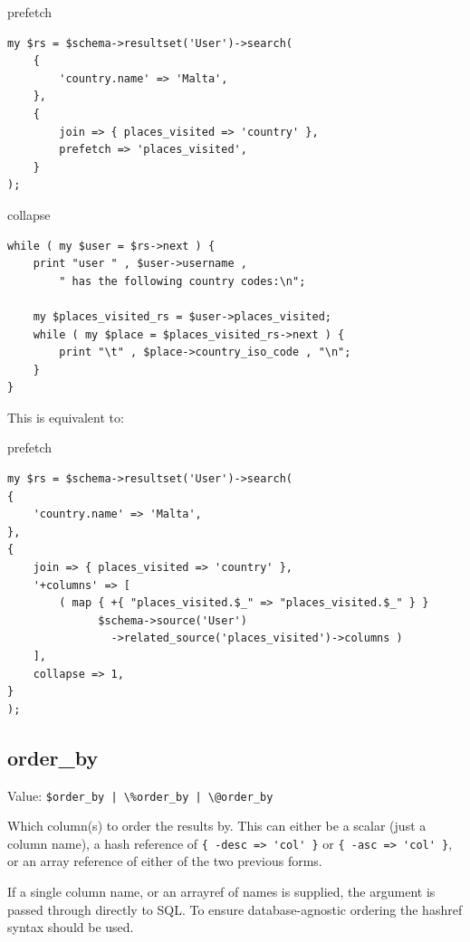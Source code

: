 \begin{frame}[fragile]{prefetch}
\begin{lstlisting}
my $rs = $schema->resultset('User')->search(
    {
        'country.name' => 'Malta',
    },
    {
        join => { places_visited => 'country' },
        prefetch => 'places_visited',
    }
);
\end{lstlisting}
\end{frame}

\begin{frame}[fragile]{collapse}
\begin{lstlisting}
while ( my $user = $rs->next ) {
    print "user " , $user->username ,
        " has the following country codes:\n";

    my $places_visited_rs = $user->places_visited;
    while ( my $place = $places_visited_rs->next ) {
        print "\t" , $place->country_iso_code , "\n";
    }
}
\end{lstlisting}
\end{frame}



This is equivalent to:

\begin{frame}[fragile]{prefetch}
\begin{lstlisting}
my $rs = $schema->resultset('User')->search(
{
    'country.name' => 'Malta',
},
{
    join => { places_visited => 'country' },
    '+columns' => [
        ( map { +{ "places_visited.$_" => "places_visited.$_" } }
              $schema->source('User')
                ->related_source('places_visited')->columns )
    ],
    collapse => 1,
}
);
\end{lstlisting}
\end{frame}

\subsection{order\_by}

Value: \verb=$order_by | \%order_by | \@order_by=

Which column(s) to order the results by. This can either be a scalar (just a
column name), a hash reference of \verb|{ -desc => 'col' }| or 
\verb|{ -asc => 'col' }|, or an array reference of either of the two
previous forms.

If a single column name, or an arrayref of names is supplied, the argument
is passed through directly to SQL. To ensure database-agnostic ordering the
hashref syntax should be used.

